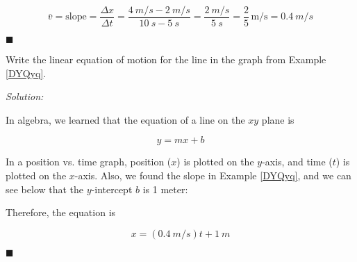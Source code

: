 \documentclass[dvipsnames]{article}
\begin{document}
\begin{equation*}
    \bar{v} = \text{slope} = \frac{\Delta x}{\Delta t} = \frac{\SI{4}{m/s} - \SI{2}{m/s}}{\SI{10}{s} - \SI{5}{s}} = \frac{\SI{2}{m/s}}{\SI{5}{s}} = \frac{2}{5}\,\text{m/s} = \boxed{\SI{0.4}{m/s}}
\end{equation*}

\hfill $\blacksquare$



\begin{example}
Write the linear equation of motion for the line in the graph from Example \ref{DYQyq}.
\end{example}

\textit{Solution:}

In algebra, we learned that the equation of a line on the $xy$ plane is

\begin{equation*}
    y = mx + b
\end{equation*}

In a position vs. time graph, position ($x$) is plotted on the $y$-axis, and time ($t$) is plotted on the $x$-axis. Also, we found the slope in Example \ref{DYQyq}, and we can see below that the $y$-intercept $b$ is 1 meter:


\begin{center}
\end{center}

Therefore, the equation is

\begin{equation*}
    x = \left(\SI{0.4}{m/s}\right) t + \SI{1}{m}
\end{equation*}

\hfill $\blacksquare$

\end{document}
